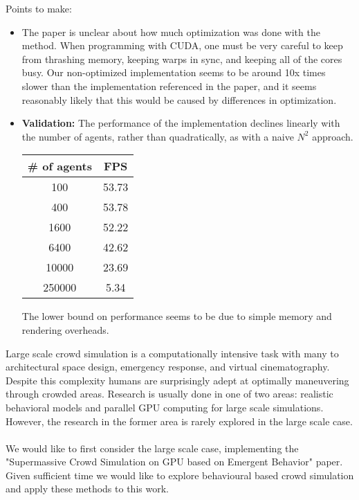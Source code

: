 \documentclass[cameraready]{acmsiggraph}  %
\begin{document}
Points to make:\\
\begin{itemize}
\item The paper is unclear about how much optimization was done with the method.  When programming with CUDA, one must be very careful to keep from thrashing memory, keeping warps in sync, and keeping all of the cores busy.  Our non-optimized implementation seems to be around 10x times slower than the implementation referenced in the paper, and it seems reasonably likely that this would be caused by differences in optimization.
\item \textbf{Validation:} The performance of the implementation declines linearly with the number of agents, rather than quadratically, as with a naive $N^2$ approach. \\
\begin{tabular}{|c||c|}
\hline
\# of agents & FPS \\  \hline 
100 & 53.73 \\  \hline 
400 & 53.78 \\  \hline 
1600 & 52.22\\  \hline 
6400 & 42.62\\  \hline 
10000 & 23.69\\  \hline 
250000 & 5.34\\  \hline 
\end{tabular}


The lower bound on performance seems to be due to simple memory and rendering overheads. 
\end{itemize}

Large scale crowd simulation is a computationally intensive task with many to architectural space design, emergency response, and virtual cinematography.  Despite this complexity humans are surprisingly adept at optimally maneuvering through crowded areas.  Research is usually done in one of two areas: realistic behavioral models and parallel GPU computing for large scale simulations.   However, the research in the former area is rarely explored in the large scale case.   \\
\\
We would like to first consider the large scale case, implementing the "Supermassive Crowd Simulation on GPU based on Emergent Behavior" \cite{passos2008} paper.  Given sufficient time we would like to explore behavioural based crowd simulation and apply these methods to this work.
\end{document}
